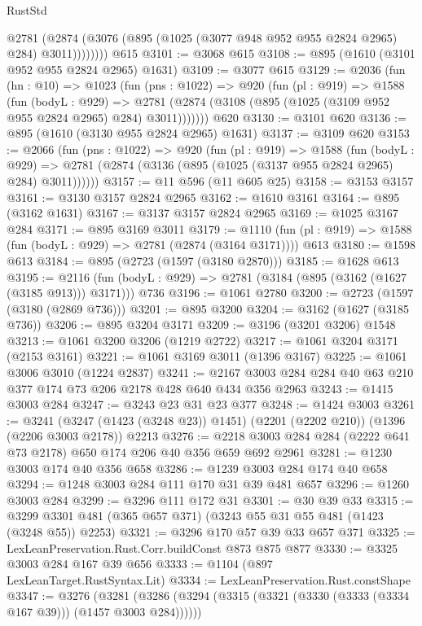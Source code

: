 \begin{lexlean}{RustStd}
\begin{coremodule}
            @2781 (@2874 (@3076 (@895 (@1025 (@3077 @948 @952 @955 @2824 @2965) @284) @3011))))))))
    @615
@3101 := @3068 @615
@3108 := @895 (@1610 (@3101 @952 @955 @2824 @2965) @1631)
@3109 := @3077 @615
@3129 := @2036
    (fun (hn : @10) =>
    @1023
      (fun (pns : @1022) =>
      @920
        (fun (pl : @919) =>
        @1588
          (fun (bodyL : @929) =>
          @2781 (@2874 (@3108 (@895 (@1025 (@3109 @952 @955 @2824 @2965) @284) @3011)))))))
    @620
@3130 := @3101 @620
@3136 := @895 (@1610 (@3130 @955 @2824 @2965) @1631)
@3137 := @3109 @620
@3153 := @2066
    (fun (pns : @1022) =>
    @920
      (fun (pl : @919) =>
      @1588
        (fun (bodyL : @929) =>
        @2781 (@2874 (@3136 (@895 (@1025 (@3137 @955 @2824 @2965) @284) @3011))))))
@3157 := @11 @596 (@11 @605 @25)
@3158 := @3153 @3157
@3161 := @3130 @3157 @2824 @2965
@3162 := @1610 @3161
@3164 := @895 (@3162 @1631)
@3167 := @3137 @3157 @2824 @2965
@3169 := @1025 @3167 @284
@3171 := @895 @3169 @3011
@3179 := @1110 (fun (pl : @919) => @1588 (fun (bodyL : @929) => @2781 (@2874 (@3164 @3171)))) @613
@3180 := @1598 @613
@3184 := @895 (@2723 (@1597 (@3180 @2870)))
@3185 := @1628 @613
@3195 := @2116 (fun (bodyL : @929) => @2781 (@3184 (@895 (@3162 (@1627 (@3185 @913))) @3171))) @736
@3196 := @1061 @2780
@3200 := @2723 (@1597 (@3180 (@2869 @736)))
@3201 := @895 @3200
@3204 := @3162 (@1627 (@3185 @736))
@3206 := @895 @3204 @3171
@3209 := @3196 (@3201 @3206) @1548
@3213 := @1061 @3200 @3206 (@1219 @2722)
@3217 := @1061 @3204 @3171 (@2153 @3161)
@3221 := @1061 @3169 @3011 (@1396 @3167)
@3225 := @1061 @3006 @3010 (@1224 @2837)
@3241 := @2167 @3003 @284 @284 @40 @63 @210 @377 @174 @73 @206 @2178 @428 @640 @434 @356 @2963
@3243 := @1415 @3003 @284
@3247 := @3243 @23 @31 @23 @377
@3248 := @1424 @3003
@3261 := @3241
    (@3247 (@1423 (@3248 @23)) @1451)
    (@2201 (@2202 @210))
    (@1396 (@2206 @3003 @2178))
    @2213
@3276 := @2218 @3003 @284 @284 (@2222 @641 @73 @2178) @650 @174 @206 @40 @356 @659 @692 @2961
@3281 := @1230 @3003 @174 @40 @356 @658
@3286 := @1239 @3003 @284 @174 @40 @658
@3294 := @1248 @3003 @284 @111 @170 @31 @39 @481 @657
@3296 := @1260 @3003 @284
@3299 := @3296 @111 @172 @31
@3301 := @30 @39 @33
@3315 := @3299 @3301 @481 (@365 @657 @371) (@3243 @55 @31 @55 @481 (@1423 (@3248 @55)) @2253)
@3321 := @3296 @170 @57 @39 @33 @657 @371
@3325 := LexLeanPreservation.Rust.Corr.buildConst @873 @875 @877
@3330 := @3325 @3003 @284 @167 @39 @656
@3333 := @1104 (@897 LexLeanTarget.RustSyntax.Lit)
@3334 := LexLeanPreservation.Rust.constShape
@3347 := @3276
    (@3281 (@3286 (@3294 (@3315 (@3321 (@3330 (@3333 (@3334 @167 @39))) (@1457 @3003 @284))))))

\end{coremodule}
\end{lexlean}
